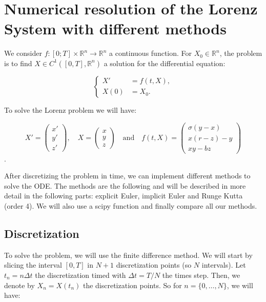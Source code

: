 \documentclass[12pt]{article}
\begin{document}
	\section{Numerical resolution of the Lorenz System with different methods}
	\label{sec4}
	
	We consider $f : [0; T] \times \mathbb{R}^n \rightarrow \mathbb{R}^n$ a continuous function. For $X_0\in \mathbb{R}^n$, the problem is to find  $X\in C^1([0,T],\mathbb{R}^n)$ a solution for the differential equation:
	
	$$\left\{\begin{aligned}
		X'&=f(t,X), \\
		X(0)&=X_0.
	\end{aligned}\right.$$
	
	\noindent To solve the Lorenz problem we will have:
	
	$$X'=\begin{pmatrix}
		x' \\
		y' \\
		z'
	\end{pmatrix}, \quad X=\begin{pmatrix}
		x \\
		y \\
		z
	\end{pmatrix} \quad \text{and} \quad f(t,X)=\begin{pmatrix}
		\sigma(y-x) \\
		x(r-z)-y \\
		xy-bz
	\end{pmatrix}$$.
	
	\noindent After discretizing the problem in time, we can implement different methods to solve the ODE. The methods are the following and will be described in more detail in the following parts: explicit Euler, implicit Euler and Runge Kutta (order 4). We will also use a scipy function and finally compare all our methods.
	
	\subsection{Discretization}
	
	To solve the problem, we will use the finite difference method. We will start by slicing the interval $[0,T]$ in $N+1$ discretization points (so $N$ intervals). Let $t_n=n\Delta t$ the discretization timed with $\Delta t=T/N$ the times step. Then, we denote by $X_n=X(t_n)$ the discretization points. So for $n=\{0,\dots,N\}$, we will have:
	
\end{document}
